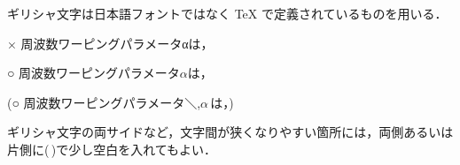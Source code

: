 ギリシャ文字は日本語フォントではなく TeX で定義されているものを用いる．

× 周波数ワーピングパラメータαは，

○ 周波数ワーピングパラメータ$\alpha$は，

(○ 周波数ワーピングパラメータ＼,$\alpha$\,は，)

ギリシャ文字の両サイドなど，文字間が狭くなりやすい箇所には，両側あるいは片側に(\,)で少し空白を入れてもよい．